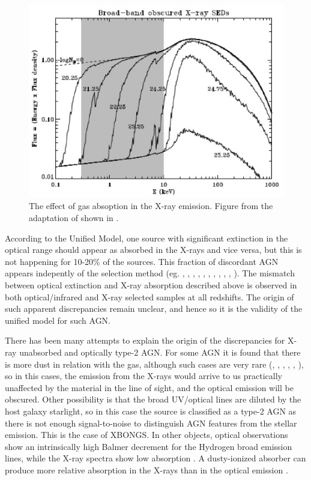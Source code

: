  \begin{figure}
 \centering
 \includegraphics[width=\textwidth]{Chapter1_intro/absx.ps}
    \caption{The effect of gas absoption in the X-ray emission. Figure from the adaptation of \cite{wilman99} shown in \cite{singh13}.}
 \label{sec1:fig_ax}
 \end{figure}



According to the Unified Model, one source with significant extinction in the optical range should appear as absorbed in the X-rays and vice versa, but this is not happening for 10-20\% of the sources. This fraction of discordant AGN appears indepently of the selection method (eg. \citealt{panessa02}, \citealt{caccianiga04}, \citealt{mateos05a}, \citeyear{mateos05b}, \citealt{mainieri05}, \citealt{caccianiga08}, \citealt{mateos10}, \citealt{corral11}, \citealt{scott12}, \citealt{page12}, \citealt{merloni14}). The mismatch between optical extinction and X-ray absorption described above is observed in both optical/infrared and X-ray selected samples at all redshifts. The origin of such apparent discrepancies remain unclear, and hence so it is the validity of the unified model for such AGN.


There has been many attempts to explain the origin of the discrepancies for X-ray unabsorbed and optically type-2 AGN. For some AGN it is found that there is more dust in relation with the gas, although such cases are very rare (\citealt{caccianiga04}, \citealt{trippe10}, \citealt{huang12}, \citealt{malizia12}, \citealt{masetti12}, \citealt{mehdipour12}), so in this cases, the emission from the X-rays would arrive to us practically unaffected by the material in the line of sight, and the optical emission will be obscured. Other possibility is that the broad UV/optical lines are diluted by the host galaxy starlight, so in this case the source is classified as a type-2 AGN as there is not enough signal-to-noise to distinguish AGN features from the stellar emission. This is the case of XBONGS. In other objects, optical observations show an intrinsically high Balmer decrement for the Hydrogen broad emission lines, while the X-ray spectra show low absorption \citep{barcons03}. A dusty-ionized absorber can produce more relative absorption in the X-rays than in the optical emission \citep{della01}.


